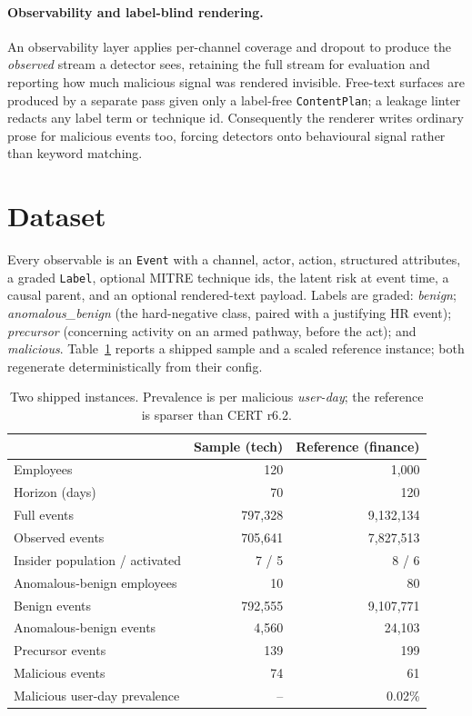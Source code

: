\documentclass[11pt]{article}
\newcommand{\code}[1]{\texttt{\small #1}}
\begin{document}
\paragraph{Observability and label-blind rendering.} An observability layer applies
per-channel coverage and dropout to produce the \emph{observed} stream a detector
sees, retaining the full stream for evaluation and reporting how much malicious signal
was rendered invisible. Free-text surfaces are produced by a separate pass given only a
label-free \code{ContentPlan}; a leakage linter redacts any label term or technique id.
Consequently the renderer writes ordinary prose for malicious events too, forcing
detectors onto behavioural signal rather than keyword matching.

\section{Dataset}
\label{sec:dataset}
Every observable is an \code{Event} with a channel, actor, action, structured
attributes, a graded \code{Label}, optional MITRE technique ids, the latent risk at
event time, a causal parent, and an optional rendered-text payload. Labels are graded:
\emph{benign}; \emph{anomalous\_benign} (the hard-negative class, paired with a
justifying HR event); \emph{precursor} (concerning activity on an armed pathway, before
the act); and \emph{malicious}. Table~\ref{tab:stats} reports a shipped sample and a
scaled reference instance; both regenerate deterministically from their config.

\begin{table}[t]
\centering
\caption{Two shipped instances. Prevalence is per malicious \emph{user-day}; the
reference is sparser than CERT r6.2.}
\label{tab:stats}
\small
\begin{tabular}{lrr}
\toprule
 & Sample (tech) & Reference (finance) \\
\midrule
Employees                      & 120      & 1{,}000 \\
Horizon (days)                 & 70       & 120 \\
Full events                    & 797{,}328 & 9{,}132{,}134 \\
Observed events                & 705{,}641 & 7{,}827{,}513 \\
Insider population / activated  & 7 / 5    & 8 / 6 \\
Anomalous-benign employees     & 10       & 80 \\
Benign events                  & 792{,}555 & 9{,}107{,}771 \\
Anomalous-benign events        & 4{,}560  & 24{,}103 \\
Precursor events               & 139      & 199 \\
Malicious events               & 74       & 61 \\
Malicious user-day prevalence  & --       & 0.02\% \\
\bottomrule
\end{tabular}
\end{table}
\end{document}
